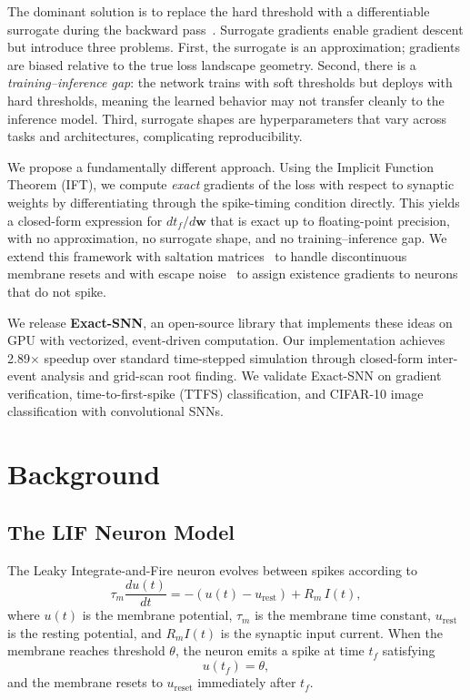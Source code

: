\documentclass[10pt,twocolumn]{article}
\begin{document}
The dominant solution is to replace the hard threshold with a differentiable surrogate during the backward pass~\citep{neftci2019surrogate,ESPOOR201975,shrestha2018slayer}. Surrogate gradients enable gradient descent but introduce three problems. First, the surrogate is an approximation; gradients are biased relative to the true loss landscape geometry. Second, there is a \emph{training--inference gap}: the network trains with soft thresholds but deploys with hard thresholds, meaning the learned behavior may not transfer cleanly to the inference model. Third, surrogate shapes are hyperparameters that vary across tasks and architectures, complicating reproducibility.

We propose a fundamentally different approach. Using the Implicit Function Theorem (IFT), we compute \emph{exact} gradients of the loss with respect to synaptic weights by differentiating through the spike-timing condition directly. This yields a closed-form expression for $dt_f/d\mathbf{w}$ that is exact up to floating-point precision, with no approximation, no surrogate shape, and no training--inference gap. We extend this framework with saltation matrices~\citep{coombes2014spiking} to handle discontinuous membrane resets and with escape noise~\citep{hertz2018intro} to assign existence gradients to neurons that do not spike.

We release \textbf{Exact-SNN}, an open-source library that implements these ideas on GPU with vectorized, event-driven computation. Our implementation achieves 2.89$\times$ speedup over standard time-stepped simulation through closed-form inter-event analysis and grid-scan root finding. We validate Exact-SNN on gradient verification, time-to-first-spike (TTFS) classification, and CIFAR-10 image classification with convolutional SNNs.

\section{Background}

\subsection{The LIF Neuron Model}

The Leaky Integrate-and-Fire neuron evolves between spikes according to
\begin{equation}
    \tau_m \frac{du(t)}{dt} = -(u(t) - u_{\text{rest}}) + R_m \, I(t),
    \label{eq:lif}
\end{equation}
where $u(t)$ is the membrane potential, $\tau_m$ is the membrane time constant, $u_{\text{rest}}$ is the resting potential, and $R_m I(t)$ is the synaptic input current. When the membrane reaches threshold $\theta$, the neuron emits a spike at time $t_f$ satisfying
\begin{equation}
    u(t_f) = \theta,
    \label{eq:spike_cond}
\end{equation}
and the membrane resets to $u_{\text{reset}}$ immediately after $t_f$.
\end{document}
